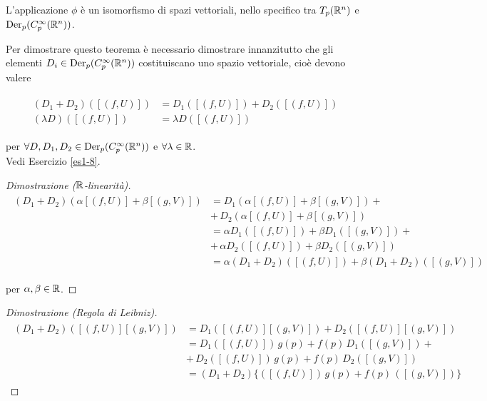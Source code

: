 \begin{theorem}
	L'applicazione $ \phi $ è un isomorfismo di spazi vettoriali, nello specifico tra $ T_{p}(\mathbb{R}^{n}) $ e $ \operatorname{Der}_{p}(C_{p}^{\infty}(\mathbb{R}^{n})) $.
\end{theorem}

Per dimostrare questo teorema è necessario dimostrare innanzitutto che gli elementi $ D_{i} \in \operatorname{Der}_{p}(C_{p}^{\infty}(\mathbb{R}^{n})) $ costituiscano uno spazio vettoriale, cioè devono valere

\begin{align}
	\begin{split}
		(D_{1} + D_{2}) ([(f,U)]) &= D_{1}([(f,U)]) + D_{2}([(f,U)])\\
		(\lambda D) ([(f,U)]) &= \lambda D ([(f,U)])
	\end{split}
\end{align}

per $ \forall D,D_{1},D_{2} \in \operatorname{Der}_{p}(C_{p}^{\infty}(\mathbb{R}^{n})) $ e $ \forall \lambda \in \mathbb{R} $.\\
Vedi Esercizio \ref{es1-8}.

\begin{proof}[Dimostrazione ($ \mathbb{R} $-linearità)]
	\begin{align}
		\begin{split}
			(D_{1} + D_{2}) (\alpha [(f,U)] + \beta [(g,V)]) &= D_{1} (\alpha [(f,U)] + \beta [(g,V)]) +\\
			&+ \, D_{2} (\alpha [(f,U)] + \beta [(g,V)])\\
			&= \alpha D_{1} ([(f,U)]) + \beta D_{1} ([(g,V)]) +\\
			&+ \,\alpha D_{2} ([(f,U)]) + \beta D_{2} ([(g,V)])\\
			&= \alpha (D_{1} + D_{2}) ([(f,U)]) + \beta (D_{1} + D_{2}) ([(g,V)])
		\end{split}
	\end{align}

	per $ \alpha,\beta \in \mathbb{R} $.
\end{proof}

\begin{proof}[Dimostrazione (Regola di Leibniz)]
	\begin{align}
		\begin{split}
			(D_{1} + D_{2}) ([(f,U)] [(g,V)]) &= D_{1} ([(f,U)] [(g,V)]) + D_{2} ([(f,U)] [(g,V)])\\
			&= D_{1} ([(f,U)]) \, g(p) + f(p) \, D_{1} ([(g,V)]) +\\
			&+ \, D_{2} ([(f,U)]) \, g(p) + f(p) \, D_{2} ([(g,V)])\\
			&= (D_{1} + D_{2}) \{ ([(f,U)]) \, g(p) + f(p) \, ([(g,V)]) \}
		\end{split}
	\end{align}
\end{proof}

